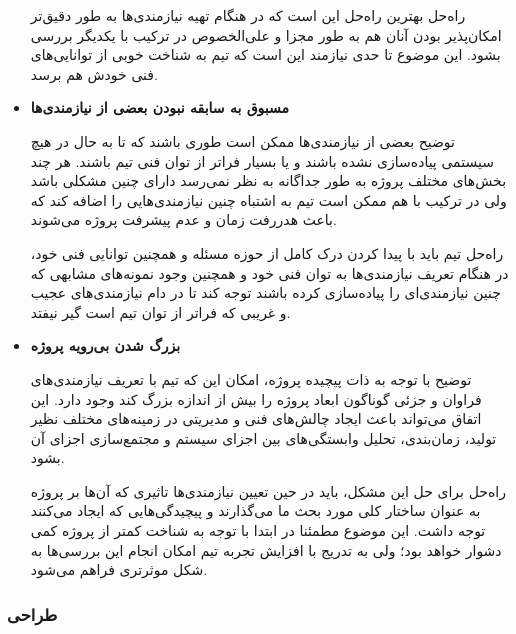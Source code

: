 \begin{itemize}
	راه‌حل \hspace*{1cm}  
	بهترین راه‌حل این است که در هنگام تهیه نیازمندی‌ها به طور دقیق‌تر امکان‌پذیر بودن آنان هم به طور مجزا و علی‌الخصوص در ترکیب با یکدیگر بررسی بشود. این موضوع تا حدی نیازمند این است که تیم به شناخت خوبی از توانایی‌های فنی خودش هم برسد.
	
	\item 
	\textbf{مسبوق به سابقه نبودن بعضی از نیازمندی‌ها}
	
		توضیح \hspace*{1cm}  
بعضی از نیازمندی‌ها ممکن است طوری باشند که تا به حال در هیچ سیستمی پیاده‌سازی نشده باشند و یا بسیار فراتر از توان فنی تیم باشند. هر چند بخش‌های مختلف پروژه به طور جداگانه به نظر نمی‌رسد دارای چنین مشکلی باشد ولی در ترکیب با هم ممکن است تیم به اشتباه چنین نیازمندی‌هایی را اضافه کند که باعث هدررفت زمان و عدم پیشرفت پروژه می‌شوند.

راه‌حل \hspace*{1cm}  
تیم باید با پیدا کردن درک کامل از حوزه مسئله و همچنین توانایی فنی خود، در هنگام تعریف نیازمندی‌ها به توان فنی خود و همچنین وجود نمونه‌های مشابهی که چنین نیازمندی‌‌ای را پیاده‌سازی کرده باشند توجه کند تا در دام نیازمندی‌های عجیب و غریبی که فراتر از توان تیم است گیر نیفتد.
	
	
	\item 
\textbf{بزرگ شدن بی‌رویه پروژه}

توضیح \hspace*{1cm}  
با توجه به ذات پیچیده پروژه، امکان این که تیم با تعریف نیازمندی‌های فراوان و جزئی گوناگون ابعاد پروژه را بیش‌ از اندازه بزرگ کند وجود دارد. این اتفاق می‌تواند باعث ایجاد چالش‌های فنی و مدیریتی در زمینه‌های مختلف نظیر تولید، زمان‌بندی، تحلیل وابستگی‌های بین اجزای سیستم و مجتمع‌سازی اجزای آن بشود.


راه‌حل \hspace*{1cm} 
برای حل این مشکل، باید در حین تعیین نیازمندی‌ها تاثیری که آن‌ها بر پروژه به عنوان ساختار کلی مورد بحث ما می‌گذارند و پیچیدگی‌هایی که ایجاد می‌کنند توجه داشت. این موضوع مطمئنا در ابتدا با توجه به شناخت‌ کمتر از پروژه کمی دشوار خواهد بود؛ ولی به تدریج با  افزایش تجربه تیم امکان انجام این بررسی‌ها به شکل موثر‌تری فراهم می‌شود.


	
\end{itemize}

\subsubsection{طراحی}


